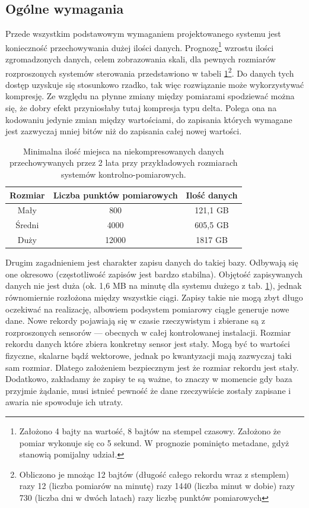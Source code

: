 \documentclass[a4paper,polish,12pt,twoside]{article}
\begin{document}
\subsection{Ogólne wymagania}
Przede wszystkim podstawowym wymaganiem projektowanego systemu jest konieczność przechowywania dużej ilości danych. Prognozę\footnote{Założono 4 bajty na wartość, 8 bajtów na stempel czasowy. Założono że pomiar wykonuje się co 5 sekund. W prognozie pominięto metadane, gdyż stanowią pomijalny udział.} wzrostu ilości zgromadzonych danych, celem zobrazowania skali, dla pewnych rozmiarów rozproszonych systemów sterowania przedstawiono w tabeli \ref{tab:datasize_wildguess}\footnote{Obliczono je mnożąc 12 bajtów (długość całego rekordu wraz z stemplem) razy 12 (liczba pomiarów na minutę) razy 1440 (liczba minut w dobie) razy 730 (liczba dni w dwóch latach) razy liczbę punktów pomiarowych}.  Do danych tych dostęp uzyskuje się stosunkowo rzadko, tak więc rozwiązanie może wykorzystywać kompresję. Ze względu na płynne zmiany między pomiarami spodziewać można się, że dobry efekt przyniosłaby tutaj kompresja typu delta. Polega ona na kodowaniu jedynie zmian między wartościami, do zapisania których wymagane jest zazwyczaj mniej bitów niż do zapisania całej nowej wartości.

\begin{table} \centering \begin{tabular}{|c|c|c|}
\hline Rozmiar & Liczba punktów pomiarowych & Ilość danych \\ \hline
Mały & 800 &121,1 GB \\
Średni & 4000 & 605,5 GB \\
Duży & 12000 & 1817 GB \\
\hline \end{tabular}
\caption{Minimalna ilość miejsca na niekompresowanych danych przechowywanych przez 2 lata przy przykładowych rozmiarach systemów kontrolno-pomiarowych.} \label{tab:datasize_wildguess} \end{table}

Drugim zagadnieniem jest charakter zapisu danych do takiej bazy. Odbywają się one okresowo (częstotliwość zapisów jest bardzo stabilna). Objętość zapisywanych danych nie jest duża (ok. 1,6 MB na minutę dla systemu dużego z tab. \ref{tab:datasize_wildguess}), jednak równomiernie rozłożona między wszystkie ciągi. Zapisy takie nie mogą zbyt długo oczekiwać na realizację, albowiem podsystem pomiarowy ciągle generuje nowe dane. Nowe rekordy pojawiają się w czasie rzeczywistym i zbierane są z rozproszonych sensorów --- obecnych w całej kontrolowanej instalacji. Rozmiar rekordu danych które zbiera konkretny sensor jest stały. Mogą być to wartości fizyczne, skalarne bądź wektorowe, jednak po kwantyzacji mają zazwyczaj taki sam rozmiar. Dlatego założeniem bezpiecznym jest że rozmiar rekordu jest stały.  Dodatkowo, zakładamy że zapisy te są ważne, to znaczy w momencie gdy baza przyjmie żądanie, musi istnieć pewność że dane rzeczywiście zostały zapisane i awaria nie spowoduje ich utraty.
\end{document}
